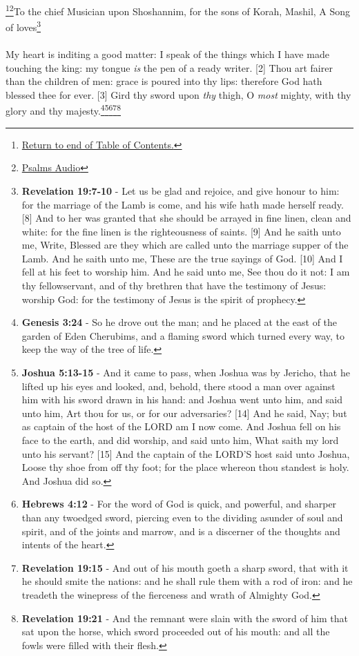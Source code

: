 \footnote{\textcolor[cmyk]{0.99998,1,0,0}{\hyperlink{TOC}{Return to end of Table of Contents.}}}\footnote{\href{https://audiobible.com/bible/psalms_45.html}{\textcolor[cmyk]{0.99998,1,0,0}{Psalms Audio}}}\textcolor[cmyk]{0.99998,1,0,0}{To the chief Musician upon Shoshannim, for the sons of Korah, Mashil, A Song of loves}\footnote{\textbf{Revelation 19:7-10} - Let us be glad and rejoice, and give honour to him: for the marriage of the Lamb is come, and his wife hath made herself ready. [8] And to her was granted that she should be arrayed in fine linen, clean and white: for the fine linen is the righteousness of saints. [9] And he saith unto me, Write, Blessed are they which are called unto the marriage supper of the Lamb. And he saith unto me, These are the true sayings of God. [10] And I fell at his feet to worship him. And he said unto me, See thou do it not: I am thy fellowservant, and of thy brethren that have the testimony of Jesus: worship God: for the testimony of Jesus is the spirit of prophecy.}\\
\\
\textcolor[cmyk]{0.99998,1,0,0}{My heart is inditing a good matter: I speak of the things which I have made touching the king: my tongue \emph{is} the pen of a ready writer.}
[2] \textcolor[cmyk]{0.99998,1,0,0}{Thou art fairer than the children of men: grace is poured into thy lips: therefore God hath blessed thee for ever.}
[3] \textcolor[cmyk]{0.99998,1,0,0}{Gird thy sword upon \emph{thy} thigh, O \emph{most} mighty, with thy glory and thy majesty.}\footnote{\textbf{Genesis 3:24} - So he drove out the man; and he placed at the east of the garden of Eden Cherubims, and a flaming sword which turned every way, to keep the way of the tree of life.}\footnote{\textbf{Joshua 5:13-15} - And it came to pass, when Joshua was by Jericho, that he lifted up his eyes and looked, and, behold, there stood a man over against him with his sword drawn in his hand: and Joshua went unto him, and said unto him, Art thou for us, or for our adversaries? [14] And he said, Nay; but as captain of the host of the LORD am I now come. And Joshua fell on his face to the earth, and did worship, and said unto him, What saith my lord unto his servant? [15] And the captain of the LORD’S host said unto Joshua, Loose thy shoe from off thy foot; for the place whereon thou standest is holy. And Joshua did so.}\footnote{\textbf{Hebrews 4:12} - For the word of God is quick, and powerful, and sharper than any twoedged sword, piercing even to the dividing asunder of soul and spirit, and of the joints and marrow, and is a discerner of the thoughts and intents of the heart.}\footnote{\textbf{Revelation 19:15} - And out of his mouth goeth a sharp sword, that with it he should smite the nations: and he shall rule them with a rod of iron: and he treadeth the winepress of the fierceness and wrath of Almighty God.}\footnote{\textbf{Revelation 19:21} - And the remnant were slain with the sword of him that sat upon the horse, which sword proceeded out of his mouth: and all the fowls were filled with their flesh.} 
